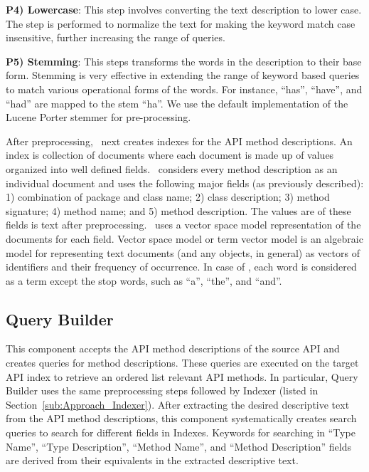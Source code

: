 \textbf{P4) Lowercase}: This step involves converting the text description to lower case. The step is performed to normalize the text for making the keyword match case insensitive, further increasing the range of queries.
	
\textbf{P5) Stemming}: This steps transforms the words in the description to their base form. Stemming is very effective in extending the range of keyword based queries to match various operational forms of the words. For instance, ``has'', ``have'', and ``had'' are mapped to the stem ``ha''. We use the default implementation of the Lucene Porter stemmer for pre-processing. 
	


After preprocessing, \tool\ next creates indexes for the API method descriptions.
An index is collection of documents where each document is made up of 
values organized into well defined fields.
\tool\ considers every method description as an individual document and 
uses the following major fields (as previously described):
1) combination of package and class name;
2) class description;
3) method signature;
4) method name; and
5) method description.
The values are of these fields is text after preprocessing.
\tool\ uses a vector space model representation of the documents for each field. 
Vector space model or term vector model is an algebraic model for representing text documents (and any objects, in general) as vectors of identifiers and their frequency of occurrence. 
In case of \tool, each word is considered as a term except the stop words, such as ``a'', ``the'', and ``and''.


  

\subsection{Query Builder}
\label{sub:Approach_Searcher}

This component accepts the API method descriptions of the source API
and creates queries for method descriptions.
These queries are executed on the target API index to retrieve 
an ordered list relevant API methods.
In particular, Query Builder uses the same preprocessing steps followed by Indexer
(listed in Section~\ref{sub:Approach_Indexer}).
After extracting the desired descriptive text from the API method descriptions,
this component systematically creates search queries to search for different fields in Indexes.
Keywords for searching in ``Type Name'', ``Type Description'', ``Method Name'', and ``Method Description'' fields are derived from their equivalents in the extracted descriptive text.


